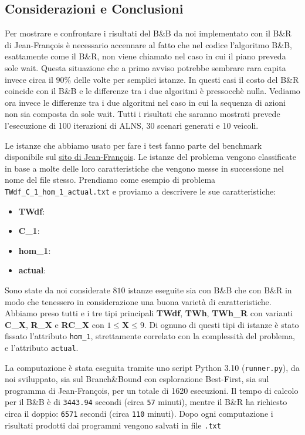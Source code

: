 \documentclass[
    article,            %
    12pt,                %
    oneside,            %
    a4paper,            %
    english,            %
    italian,                %
    sumario=tradicional,
]{abntex2}
\begin{document}
\newpage
\subsection{Considerazioni e Conclusioni}
Per mostrare e confrontare i risultati del B\&B da noi implementato con il B\&R di Jean-François è necessario accennare al fatto che nel codice l'algoritmo B\&B, esattamente come il B\&R, non viene chiamato nel caso in cui il piano preveda sole wait. Questa situazione che a primo avviso potrebbe sembrare rara capita invece circa il $90\%$ delle volte per semplici istanze. In questi casi il costo del B\&R coincide con il B\&B e le differenze tra i due algoritmi è pressocchè nulla. Vediamo ora invece le differenze tra i due algoritmi nel caso in cui la sequenza di azioni non sia composta da sole wait. Tutti i risultati che saranno mostrati prevede l'esecuzione di 100 iterazioni di ALNS, 30 scenari generati e 10 veicoli.


Le istanze che abbiamo usato per fare i test fanno parte del benchmark disponibile sul \href{https://sites.google.com/view/jfcote/}{sito di Jean-François}. Le istanze del problema vengono classificate in base a molte delle loro caratteristiche che vengono messe in successione nel nome del file stesso. Prendiamo come esempio di problema \texttt{TWdf\_C\_1\_hom\_1\_actual.txt} e proviamo a descrivere le sue caratteristiche:
\begin{itemize}
    \item \textbf{TWdf}:
    \item \textbf{C\_1}:
    \item \textbf{hom\_1}:
    \item \textbf{actual}:
\end{itemize}
Sono state da noi considerate $810$ istanze eseguite sia con B\&B che con B\&R in modo che tenessero in considerazione una buona varietà di caratteristiche. Abbiamo preso tutti e i tre tipi principali \textbf{TWdf}, \textbf{TWh}, \textbf{TWh\_R} con varianti \textbf{C\_X}, \textbf{R\_X} e \textbf{RC\_X} con $1 \leq \textbf{X} \leq 9$. Di ognuno di questi tipi di istanze è stato fissato l'attributo \texttt{hom\_1}, strettamente correlato con la complessità del problema, e l'attributo \texttt{actual}.

La computazione è stata eseguita tramite uno script Python 3.10 (\texttt{runner.py}), da noi sviluppato, sia sul Branch\&Bound con esplorazione Best-First, sia sul programma di Jean-François, per un totale di 1620 esecuzioni. Il tempo di calcolo per il B\&B è di \texttt{3443.94} secondi (circa \texttt{57} minuti), mentre il B\&R ha richiesto circa il doppio: \texttt{6571} secondi (circa \texttt{110} minuti). Dopo ogni computazione i risultati prodotti dai programmi vengono salvati in file \texttt{.txt}
\end{document}
